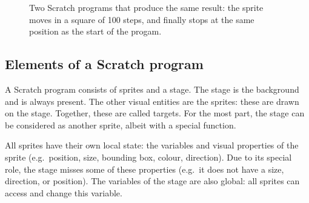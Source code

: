 \documentclass[../main]{subfiles}
\begin{document}
\begin{figure}
    \centering
    \begin{subfigure}{0.45\textwidth}
        \centering
        \begin{scratch}[scale=1]
        \end{scratch}
    \end{subfigure}
    \begin{subfigure}{0.45\textwidth}
        \centering
        \begin{scratch}[scale=1]
        \end{scratch}
    \end{subfigure}
    \caption{Two Scratch programs that produce the same result: the sprite moves in a square of 100 steps, and finally stops at the same position as the start of the progam.}\label{fig:scratch-two-programs}
\end{figure}

\subsection{Elements of a Scratch program}\label{subsec:elements-of-a-scratch-program}

A Scratch program consists of sprites and a stage.
The stage is the background and is always present.
The other visual entities are the sprites: these are drawn on the stage.
Together, these are called targets.
For the most part, the stage can be considered as another sprite, albeit with a special function.

All sprites have their own local state: the variables and visual properties of the sprite (e.g.\ position, size, bounding box, colour, direction).
Due to its special role, the stage misses some of these properties (e.g.\ it does not have a size, direction, or position).
The variables of the stage are also global: all sprites can access and change this variable.
\end{document}
